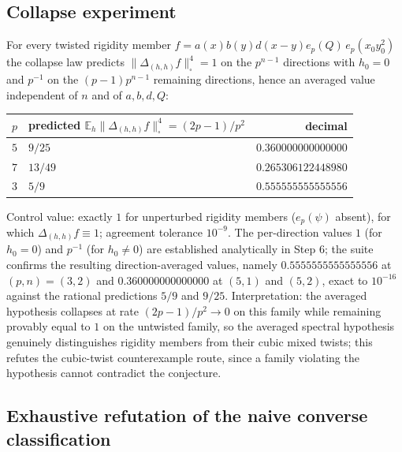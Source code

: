 \documentclass[11pt]{article}
\begin{document}
\subsection{Collapse experiment}
For every twisted rigidity member
$f=a(x)b(y)d(x-y)e_p(Q)\,e_p(x_0y_0^{2})$ the collapse law predicts
$\bigl\|\Delta_{(h,h)}f\bigr\|_\square^4=1$ on the $p^{n-1}$ directions with
$h_0=0$ and $p^{-1}$ on the $(p-1)p^{n-1}$ remaining directions, hence an
averaged value independent of $n$ and of $a,b,d,Q$:
\begin{center}
\begin{tabular}{llr}
\toprule
$p$ & predicted $\mathbb{E}_h\|\Delta_{(h,h)}f\|_\square^4=(2p-1)/p^{2}$ & decimal \\
\midrule
$5$ & $9/25$ & $0.360000000000000$ \\
$7$ & $13/49$ & $0.265306122448980$ \\
$3$ & $5/9$ & $0.555555555555556$ \\
\bottomrule
\end{tabular}
\end{center}
Control value: exactly $1$ for unperturbed rigidity members ($e_p(\psi)$
absent), for which $\Delta_{(h,h)}f\equiv1$; agreement tolerance $10^{-9}$.
The per-direction values $1$ (for $h_0=0$) and $p^{-1}$ (for $h_0\neq0$) are
established analytically in Step 6; the suite confirms the resulting
direction-averaged values, namely $0.5555555555555556$ at $(p,n)=(3,2)$ and
$0.360000000000000$ at $(5,1)$ and $(5,2)$, exact to $10^{-16}$ against the
rational predictions $5/9$ and $9/25$. Interpretation: the averaged hypothesis collapses at rate
$(2p-1)/p^{2}\to0$ on this family while remaining provably equal to $1$ on
the untwisted family, so the averaged spectral hypothesis genuinely
distinguishes rigidity members from their cubic mixed twists; this refutes
the cubic-twist counterexample route, since a family violating the hypothesis
cannot contradict the conjecture.

\subsection*{Exhaustive refutation of the naive converse classification}
\end{document}
